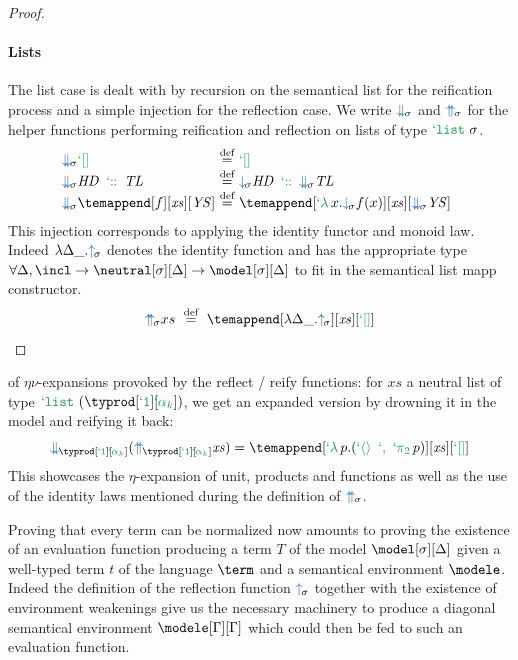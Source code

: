 \documentclass[preprint]{sigplanconf}
\begin{document}
\begin{proof}
\paragraph{Lists} The list case is dealt with by recursion on the semantical
list for the reification process and a simple injection for the reflection
case. We write $\listreify$ and $\listreflect$ for the helper functions
performing reification and reflection on lists of type $\tylist$.
$$\begin{array}{@{\listreify}l@{~\eqdef~}l}
\tenil                                  & \tenil \\
\mathit{HD} \tecons \mathit{TL}         & \reify \mathit{HD} \tecons \listreify \mathit{TL} \\
\temappend[f][\mathit{xs}][\mathit{YS}] & \temappend[\telam x.\reify f(x)][\mathit{xs}][\listreify \mathit{YS}]
\end{array}$$
This injection corresponds to applying the identity functor and monoid law. Indeed
$\lambda \Delta \_. \reflect$ denotes the identity function and has the appropriate
type $\forall \Delta, \incl \rightarrow \neutral[\sigma][\Delta] \rightarrow
\model[\sigma][\Delta]$
to fit in the semantical list mapp constructor.
$$\listreflect xs ~\eqdef~ \temappend[\lambda \Delta \_. \reflect][\mathit{xs}][\tenil]$$
\end{proof}

\begin{example} of $\eta\nu$-expansions provoked by the reflect / reify functions:
for $\mathit{xs}$ a neutral list of type $\gdef\pub{\typrod[\tyunit][\hspace{-3pt}\tybase]}\def\Tpub{\tylist[(\pub)]}\Tpub$,
we get an expanded version by drowning it in the model and reifying it back:
$$\listreify[\pub] (\listreflect[\pub] \mathit{xs}) =
\temappend[\telam p. (\tett \tepair \tepide p)][\mathit{xs}][\tenil]$$
This showcases the $\eta$-expansion of unit, products and functions as well as the
use of the identity laws mentioned during the definition of $\listreflect$.
\end{example}

Proving that every term can be normalized now amounts to proving the existence of
an evaluation function producing a term $T$ of the model $\model[\sigma][\Delta]$
given a well-typed term $t$ of the language $\term$ and a semantical environment
$\modele$. Indeed the definition of the reflection function $\reflect$ together
with the existence of environment weakenings give us the necessary machinery to
produce a diagonal semantical environment $\modele[\Gamma][\Gamma]$ which could
then be fed to such an evaluation function.
\end{document}
